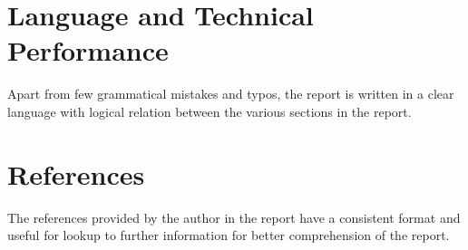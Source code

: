 \documentclass[12pt]{article}
\begin{document}
\section{Language and Technical Performance}

Apart from few grammatical mistakes and typos, the report is written in a clear language with logical relation between the various sections in the report.


\section{References}
The references provided by the author in the report have a consistent format and useful for lookup to further information for better comprehension of the report.
\end{document}
